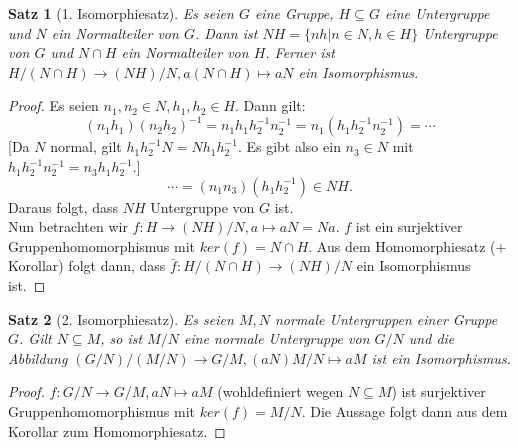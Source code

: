 \documentclass[12pt]{scrartcl}%
\newtheorem{thm}{Satz}
\theoremstyle{definition}
\theoremstyle{remark}
\begin{document}
\begin{thm}[1. Isomorphiesatz]
	Es seien $G$ eine Gruppe, $H \subseteq G$ eine Untergruppe und $N$ ein Normalteiler von $G$. Dann ist $NH = \{nh | n \in N, h \in H\}$ Untergruppe von $G$ und $N \cap H$ ein Normalteiler von $H$. Ferner ist $H/(N \cap H) \rightarrow (NH)/N, a(N \cap H) \mapsto aN$ ein Isomorphismus.
\end{thm}

\begin{proof}
	Es seien $n_1, n_2 \in N, h_1, h_2 \in H$. Dann gilt:
	$$ (n_1h_1)(n_2h_2)^{-1} = n_1h_1h_2^{-1}n_2^{-1} = n_1(h_1h_2^{-1}n_2^{-1}) = \dotsb $$
	[Da $N$ normal, gilt $h_1h_2^{-1}N = Nh_1h_2^{-1}$. Es gibt also ein $n_3 \in N$ mit $h_1h_2^{-1}n_2^{-1} = n_3h_1h_2^{-1}$.]
	$$ \dotsb = (n_1n_3)(h_1h_2^{-1}) \in NH.$$
	Daraus folgt, dass $NH$ Untergruppe von $G$ ist. \\
	Nun betrachten wir $f: H \rightarrow (NH)/N, a \mapsto aN = Na$. $f$ ist ein surjektiver Gruppenhomomorphismus mit $ker(f) = N \cap H$. Aus dem Homomorphiesatz (+ Korollar) folgt dann, dass $\bar{f}: H/(N \cap H) \rightarrow (NH)/N$ ein Isomorphismus ist.
\end{proof}

\begin{thm}[2. Isomorphiesatz]
	Es seien $M, N$ normale Untergruppen einer Gruppe $G$. Gilt $N \subseteq M$, so ist $M/N$ eine normale Untergruppe von $G/N$ und die Abbildung $(G/N)/(M/N) \rightarrow G/M, (aN)M/N \mapsto aM$ ist ein Isomorphismus.
\end{thm}

\begin{proof}
	$f: G/N \rightarrow G/M, aN \mapsto aM$ (wohldefiniert wegen $N \subseteq M$) ist surjektiver Gruppenhomomorphismus mit $ker(f) = M/N$. Die Aussage folgt dann aus dem Korollar zum Homomorphiesatz.
\end{proof}
\end{document}
